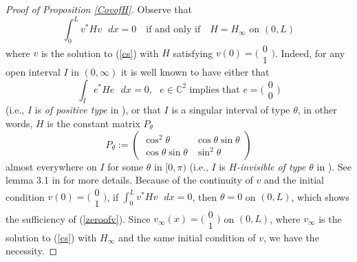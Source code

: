 \documentclass[preprint,12pt]{elsarticle}
\newcommand{\C}{{\mathbb C}}
\begin{document}
\begin{proof}[Proof of Proposition \ref{CovofH}]
Observe that 
\begin{equation}
\label{zeroofv}
\int_0^L v^*Hv \textrm{ } dx = 0 \quad\textrm{if and only if}\quad H=H_{\infty} \textrm{ on } (0,L)
\end{equation}
where $v$ is the solution to (\ref{cs}) with $H$ satisfying $v(0)=\big( \begin{smallmatrix} 0 \\ 1 \end{smallmatrix}\big)$. 
Indeed, for any open interval $I$ in $(0,\infty)$ it is well known to have either that 
\begin{equation*}
\int_I e^*H e\textrm{ } dx=0,\textrm{ }  e\in\C^2 \textrm{ implies that } e=\big( \begin{smallmatrix} 0 \\ 0 \end{smallmatrix}\big)
\end{equation*}
(i.e., $I$ is \textit{of positive type} in \cite{HSW}),  
or that $I$ is a singular interval of type $\theta$, in other words, $H$ is the constant matrix $P_{\theta}$ 
\begin{equation}
\label{singularinterval}
P_{\theta}:=
\begin{pmatrix} \cos^2\theta& \cos\theta \sin \theta \\ \cos \theta \sin \theta & \sin^2\theta \end{pmatrix}
\end{equation}
almost everywhere on $I$ for some $\theta$ in $[0,\pi)$ (i.e., $I$ is \textit{$H$-invisible of type $\theta$} in \cite{HSW}). See lemma 3.1 in \cite{HSW} for more details.
Because of the continuity of $v$ and the initial condition $v(0)=\big( \begin{smallmatrix} 0 \\ 1 \end{smallmatrix}\big)$, if $\int_0^L v^*Hv \textrm{ } dx = 0$, then $\theta=0$ on $(0,L)$, which shows the sufficiency of (\ref{zeroofv}). Since $v_{\infty}(x)= \big( \begin{smallmatrix} 0 \\ 1 \end{smallmatrix}\big)$ on $(0,L)$, where $v_{\infty}$ is the solution to (\ref{cs}) with $H_{\infty}$ and the same initial condition of $v$, we have the necessity. 


\end{proof}
\end{document}
